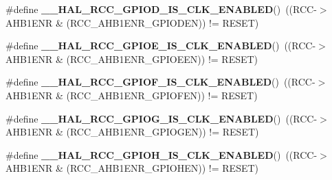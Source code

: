 \begin{DoxyCompactItemize}
\item 
\mbox{\label{group___r_c_c_ex___peripheral___clock___enable___disable___status_ga7a8a0e334d69163b25692f0450dc569a}} 
\#define {\bfseries \+\_\+\+\_\+\+H\+A\+L\+\_\+\+R\+C\+C\+\_\+\+G\+P\+I\+O\+D\+\_\+\+I\+S\+\_\+\+C\+L\+K\+\_\+\+E\+N\+A\+B\+L\+ED}()~((R\+CC-\/$>$A\+H\+B1\+E\+NR \& (R\+C\+C\+\_\+\+A\+H\+B1\+E\+N\+R\+\_\+\+G\+P\+I\+O\+D\+EN)) != R\+E\+S\+ET)
\item 
\mbox{\label{group___r_c_c_ex___peripheral___clock___enable___disable___status_ga2c0dd8ae5cf2026dab691c05f55fa384}} 
\#define {\bfseries \+\_\+\+\_\+\+H\+A\+L\+\_\+\+R\+C\+C\+\_\+\+G\+P\+I\+O\+E\+\_\+\+I\+S\+\_\+\+C\+L\+K\+\_\+\+E\+N\+A\+B\+L\+ED}()~((R\+CC-\/$>$A\+H\+B1\+E\+NR \& (R\+C\+C\+\_\+\+A\+H\+B1\+E\+N\+R\+\_\+\+G\+P\+I\+O\+E\+EN)) != R\+E\+S\+ET)
\item 
\mbox{\label{group___r_c_c_ex___peripheral___clock___enable___disable___status_ga5c997b15dc4bc3fd8e5b43193e4b1a2d}} 
\#define {\bfseries \+\_\+\+\_\+\+H\+A\+L\+\_\+\+R\+C\+C\+\_\+\+G\+P\+I\+O\+F\+\_\+\+I\+S\+\_\+\+C\+L\+K\+\_\+\+E\+N\+A\+B\+L\+ED}()~((R\+CC-\/$>$A\+H\+B1\+E\+NR \& (R\+C\+C\+\_\+\+A\+H\+B1\+E\+N\+R\+\_\+\+G\+P\+I\+O\+F\+EN)) != R\+E\+S\+ET)
\item 
\mbox{\label{group___r_c_c_ex___peripheral___clock___enable___disable___status_ga3770796716f63a656285dcfedf8c0651}} 
\#define {\bfseries \+\_\+\+\_\+\+H\+A\+L\+\_\+\+R\+C\+C\+\_\+\+G\+P\+I\+O\+G\+\_\+\+I\+S\+\_\+\+C\+L\+K\+\_\+\+E\+N\+A\+B\+L\+ED}()~((R\+CC-\/$>$A\+H\+B1\+E\+NR \& (R\+C\+C\+\_\+\+A\+H\+B1\+E\+N\+R\+\_\+\+G\+P\+I\+O\+G\+EN)) != R\+E\+S\+ET)
\item 
\mbox{\label{group___r_c_c_ex___peripheral___clock___enable___disable___status_ga8e182ed43301e2586bc198a729b50436}} 
\#define {\bfseries \+\_\+\+\_\+\+H\+A\+L\+\_\+\+R\+C\+C\+\_\+\+G\+P\+I\+O\+H\+\_\+\+I\+S\+\_\+\+C\+L\+K\+\_\+\+E\+N\+A\+B\+L\+ED}()~((R\+CC-\/$>$A\+H\+B1\+E\+NR \& (R\+C\+C\+\_\+\+A\+H\+B1\+E\+N\+R\+\_\+\+G\+P\+I\+O\+H\+EN)) != R\+E\+S\+ET)

\end{DoxyCompactItemize}
